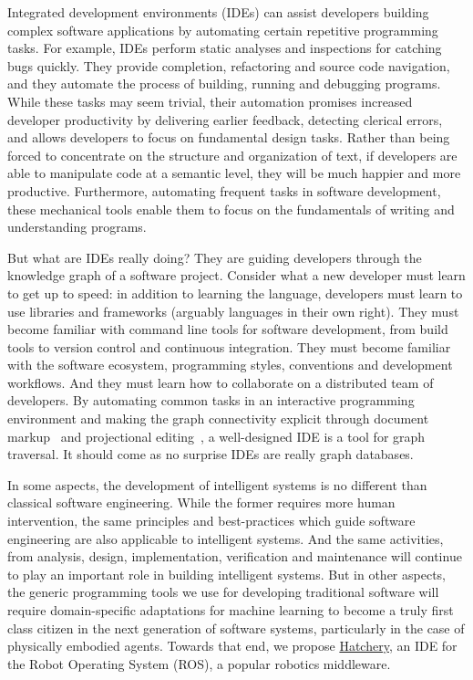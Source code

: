 \documentclass[12pt,initial,twoside,maitrise]{dms}
\numberwithin{equation}{section}
\numberwithin{table}{chapter}
\numberwithin{figure}{chapter}
\begin{document}
Integrated development environments (IDEs) can assist developers building complex software applications by automating certain repetitive programming tasks. For example, IDEs perform static analyses and inspections for catching bugs quickly. They provide completion, refactoring and source code navigation, and they automate the process of building, running and debugging programs. While these tasks may seem trivial, their automation promises increased developer productivity by delivering earlier feedback, detecting clerical errors, and allows developers to focus on fundamental design tasks. Rather than being forced to concentrate on the structure and organization of text, if developers are able to manipulate code at a semantic level, they will be much happier and more productive. Furthermore, automating frequent tasks in software development, these mechanical tools enable them to focus on the fundamentals of writing and understanding programs.

But what are IDEs really doing? They are guiding developers through the knowledge graph of a software project. Consider what a new developer must learn to get up to speed: in addition to learning the language, developers must learn to use libraries and frameworks (arguably languages in their own right). They must become familiar with command line tools for software development, from build tools to version control and continuous integration. They must become familiar with the software ecosystem, programming styles, conventions and development workflows. And they must learn how to collaborate on a distributed team of developers. By automating common tasks in an interactive programming environment and making the graph connectivity explicit through document markup~\cite{goldfarb1981generalized} and projectional editing~\cite{voelter2014towards}, a well-designed IDE is a tool for graph traversal. It should come as no surprise IDEs are really graph databases.

In some aspects, the development of intelligent systems is no different than classical software engineering. While the former requires more human intervention, the same principles and best-practices which guide software engineering are also applicable to intelligent systems. And the same activities, from analysis, design, implementation, verification and maintenance will continue to play an important role in building intelligent systems. But in other aspects, the generic programming tools we use for developing traditional software will require domain-specific adaptations for machine learning to become a truly first class citizen in the next generation of software systems, particularly in the case of physically embodied agents. Towards that end, we propose \href{https://github.com/duckietown/hatchery}{Hatchery}, an IDE for the Robot Operating System (ROS), a popular robotics middleware.
\end{document}
